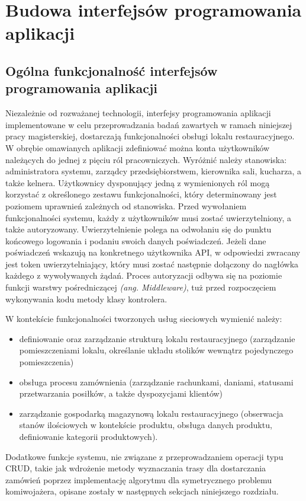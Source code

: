 \section{Budowa interfejsów programowania aplikacji}
\subsection*{Ogólna funkcjonalność interfejsów programowania aplikacji}
Niezależnie od rozważanej technologii, interfejsy programowania aplikacji implementowane w celu przeprowadzania badań zawartych w ramach niniejszej pracy magisterskiej, dostarczają funkcjonalności obsługi lokalu restauracyjnego. W obrębie omawianych aplikacji zdefiniować można konta użytkowników należących do jednej z pięciu ról pracowniczych. Wyróżnić należy stanowiska: administratora systemu, zarządcy przedsiębiorstwem, kierownika sali, kucharza, a także kelnera. Użytkownicy dysponujący jedną z wymienionych ról mogą korzystać z określonego zestawu funkcjonalności, który determinowany jest poziomem uprawnień zależnych od stanowiska. Przed wywołaniem funkcjonalności systemu, każdy z użytkowników musi zostać uwierzytelniony, a także autoryzowany. Uwierzytelnienie polega na odwołaniu się do punktu końcowego logowania i podaniu swoich danych poświadczeń. Jeżeli dane poświadczeń wskazują na konkretnego użytkownika API, w odpowiedzi zwracany jest token uwierzytelniający, który musi zostać następnie dołączony do nagłówka każdego z wywoływanych żądań. Proces autoryzacji odbywa się na poziomie funkcji warstwy pośredniczącej \textit{(ang. Middleware)}, tuż przed rozpoczęciem wykonywania kodu metody klasy kontrolera.

W kontekście funkcjonalności tworzonych usług sieciowych wymienić należy:
\begin{itemize}
    \item definiowanie oraz zarządzanie strukturą lokalu restauracyjnego (zarządzanie pomieszczeniami lokalu, określanie układu stolików wewnątrz pojedynczego pomieszczenia)
    \item obsługa procesu zamównienia (zarządzanie rachunkami, daniami, statusami przetwarzania posiłków, a także dyspozycjami klientów)
    \item zarządzanie gospodarką magazynową lokalu restauracyjnego (obserwacja stanów ilościowych w kontekście produktu, obsługa danych produktu, definiowanie kategorii produktowych).
\end{itemize}

Dodatkowe funkcje systemu, nie związane z przeprowadzaniem operacji typu CRUD, takie jak wdrożenie metody wyznaczania trasy dla dostarczania zamówień poprzez implementację algorytmu dla symetrycznego problemu komiwojażera, opisane zostały w następnych sekcjach niniejszego rozdziału.
